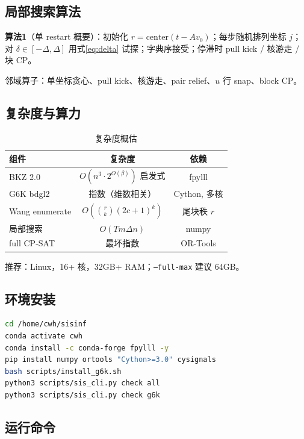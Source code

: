 \documentclass[12pt,a4paper]{ctexart}
\begin{document}
\subsection{局部搜索算法}

\textbf{算法1}（单 restart 概要）：初始化 $r=\mathrm{center}(t{-}Av_0)$；每步随机排列坐标 $j$；对 $\delta\in[-\Delta,\Delta]$ 用式\eqref{eq:delta} 试探；字典序接受；停滞时 pull kick / 核游走 / 块 CP。

邻域算子：单坐标贪心、pull kick、核游走、pair relief、$u$ 行 snap、block CP。

\subsection{复杂度与算力}

\begin{table}[htbp]
  \centering
  \caption{复杂度概估}
  \label{tab:complexity}
  \small
  \begin{tabular}{lcc}
    \toprule
    组件 & 复杂度 & 依赖 \\
    \midrule
    BKZ 2.0 & $O(n^3\cdot 2^{O(\beta)})$ 启发式 & fpylll \\
    G6K bdgl2 & 指数（维数相关） & Cython, 多核 \\
    Wang enumerate & $O(\binom{r}{k}(2c{+}1)^k)$ & 尾块秩 $r$ \\
    局部搜索 & $O(Tm\Delta n)$ & numpy \\
    full CP-SAT & 最坏指数 & OR-Tools \\
    \bottomrule
  \end{tabular}
\end{table}

推荐：Linux，16+ 核，32GB+ RAM；\texttt{--full-max} 建议 64GB。

\subsection{环境安装}

\begin{lstlisting}[language=bash]
cd /home/cwh/sisinf
conda activate cwh
conda install -c conda-forge fpylll -y
pip install numpy ortools "Cython>=3.0" cysignals
bash scripts/install_g6k.sh
python3 scripts/sis_cli.py check all
python3 scripts/sis_cli.py check g6k
\end{lstlisting}

\subsection{运行命令}
\end{document}

